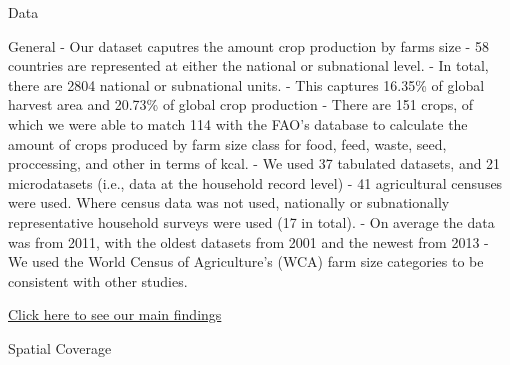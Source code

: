 \documentclass[11pt]{article}
\begin{document}
    Data

    General - Our dataset caputres the amount crop production by farms size
- 58 countries are represented at either the national or subnational
level. - In total, there are 2804 national or subnational units. - This
captures 16.35\% of global harvest area and 20.73\% of global crop
production - There are 151 crops, of which we were able to match 114
with the FAO's database to calculate the amount of crops produced by
farm size class for food, feed, waste, seed, proccessing, and other in
terms of kcal. - We used 37 tabulated datasets, and 21 microdatasets
(i.e., data at the household record level) - 41 agricultural censuses
were used. Where census data was not used, nationally or subnationally
representative household surveys were used (17 in total). - On average
the data was from 2011, with the oldest datasets from 2001 and the
newest from 2013 - We used the World Census of Agriculture's (WCA) farm
size categories to be consistent with other studies.

\href{https://vinnyricciardi.github.io/farmsize_site/Html/General_Results}{Click
here to see our main findings}

    Spatial Coverage
\end{document}
